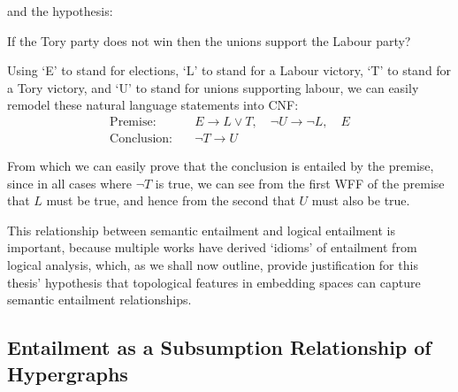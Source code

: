 \documentclass[12pt,twoside]{report}
\begin{document}
\par and the hypothesis:
\begin{flushleft}
If the Tory party does not win then the unions
support the Labour party?    
\end{flushleft}

Using `E' to stand for elections, `L' to stand for a Labour victory, `T' to stand for a Tory victory, and `U' to stand for unions supporting labour, we can easily remodel these natural language statements into CNF: 
\begin{align*}
\text{Premise:} \quad & E \rightarrow L \lor T, \quad \lnot U \rightarrow \lnot L, \quad E \\
\text{Conclusion:} \quad & \lnot T \rightarrow U
\end{align*}

From which we can easily prove that the conclusion is entailed by the premise, since in all cases where $\lnot T$ is true, we can see from the first WFF of the premise that $L$ must be true, and hence from the second that $U$ must also be true. \newline \par

This relationship between semantic entailment and logical entailment is important, because multiple works have derived `idioms' of entailment from logical analysis, which, as we shall now outline, provide justification for this thesis' hypothesis that topological features in embedding spaces can capture semantic entailment relationships. 

\subsection{Entailment as a Subsumption Relationship of Hypergraphs}
\end{document}
